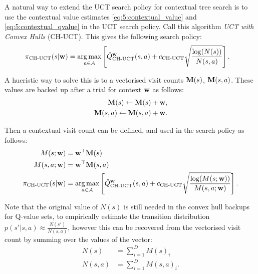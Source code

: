 





        A natural way to extend the UCT search policy for contextual tree search is to use the contextual value estimates \eqref{eq:5:contextual_value} and \eqref{eq:5:contextual_qvalue} in the UCT search policy. Call this algorithm \textit{UCT with Convex Hulls} (CH-UCT). This gives the following search policy:
        \begin{align}
            {\pi_{{\textnormal{CH-UCT}}}}(s|\mathbf{w}) &= \operatorname*{arg\,max}_{a\in\mathcal{A}} \left[
                {\hat{Q}^{\mathbf{w}}_{{\textnormal{CH-UCT}}}}(s,a) + {c_{{\textnormal{CH-UCT}}}} \sqrt{\frac{\log(N(s))}{N(s,a)}} \right].
        \end{align}

         A hueristic way to solve this is to a vectorised visit counts $\mathbf{M}(s)$, $\mathbf{M}(s,a)$. These values are backed up after a trial for context $\mathbf{w}$ as follows:
        \begin{align}
            \mathbf{M}(s) \leftarrow \mathbf{M}(s) + \mathbf{w}, \\
            \mathbf{M}(s,a) \leftarrow \mathbf{M}(s,a) + \mathbf{w}.
        \end{align}

        Then a contextual visit count can be defined, and used in the search policy as follows:
        \begin{align}
            M(s;\mathbf{w}) &= \mathbf{w}^\top \mathbf{M}(s) \\
            M(s,a;\mathbf{w}) &= \mathbf{w}^\top \mathbf{M}(s,a) \\
            {\pi_{{\textnormal{CH-UCT}}}}(s|\mathbf{w}) &= \operatorname*{arg\,max}_{a\in\mathcal{A}} \left[
                {\hat{Q}^{\mathbf{w}}_{{\textnormal{CH-UCT}}}}(s,a) + {c_{{\textnormal{CH-UCT}}}} \sqrt{\frac{\log(M(s;\mathbf{w}))}{M(s,a;\mathbf{w})}} \right].
        \end{align}

        Note that the original value of $N(s)$ is still needed in the convex hull backups for Q-value sets, to empirically estimate the transition distribution $p(s'|s,a)\approx \frac{N(s')}{N(s,a)}$, however this can be recovered from the vectorised visit count by summing over the values of the vector:
        \begin{align}
            N(s) &= \sum_{i=1}^D M(s)_i \\
            N(s,a) &= \sum_{i=1}^D M(s,a)_i.
        \end{align}

